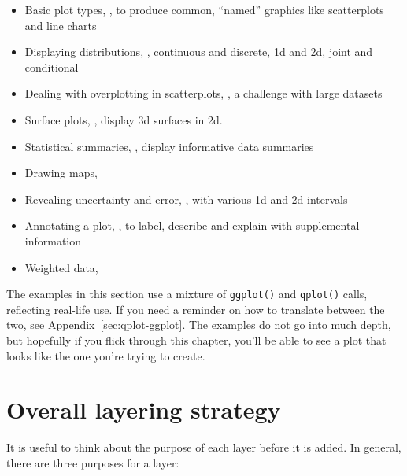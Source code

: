 \begin{itemize}
  \item Basic plot types, , to produce common, ``named'' graphics like scatterplots and line charts
  
  \item Displaying distributions, , continuous and discrete, 1d and 2d, joint and conditional
  
  \item Dealing with overplotting in scatterplots, , a challenge with large datasets

  \item Surface plots, , display 3d surfaces in 2d.

  \item Statistical summaries, , display informative data summaries

  \item Drawing maps, 

  \item Revealing uncertainty and error, , with various 1d and 2d intervals

  \item Annotating a plot, , to label, describe and explain with supplemental information

  \item Weighted data, 
\end{itemize}

The examples in this section use a mixture of {\tt ggplot()} and {\tt qplot()} calls, reflecting real-life use.  If you need a reminder on how to translate between the two, see Appendix~\ref{sec:qplot-ggplot}.  The examples do not go into much depth, but hopefully if you flick through this chapter, you'll be able to see a plot that looks like the one you're trying to create.

\section{Overall layering strategy}
\label{sec:strategy}

It is useful to think about the purpose of each layer before it is added.  In general, there are three purposes for a layer:

